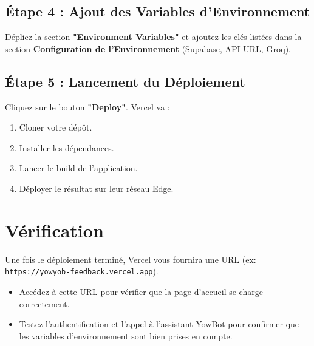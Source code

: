 \documentclass[a4paper,12pt]{article}
\begin{document}
\subsection{Étape 4 : Ajout des Variables d'Environnement}
Dépliez la section \textbf{"Environment Variables"} et ajoutez les clés listées dans la section \textbf{Configuration de l'Environnement} (Supabase, API URL, Groq).

\subsection{Étape 5 : Lancement du Déploiement}
Cliquez sur le bouton \textbf{"Deploy"}. Vercel va :
\begin{enumerate}
    \item Cloner votre dépôt.
    \item Installer les dépendances.
    \item Lancer le build de l'application.
    \item Déployer le résultat sur leur réseau Edge.
\end{enumerate}

\section{Vérification}
Une fois le déploiement terminé, Vercel vous fournira une URL (ex: \texttt{https://yowyob-feedback.vercel.app}).
\begin{itemize}
    \item Accédez à cette URL pour vérifier que la page d'accueil se charge correctement.
    \item Testez l'authentification et l'appel à l'assistant YowBot pour confirmer que les variables d'environnement sont bien prises en compte.
\end{itemize}
\end{document}
